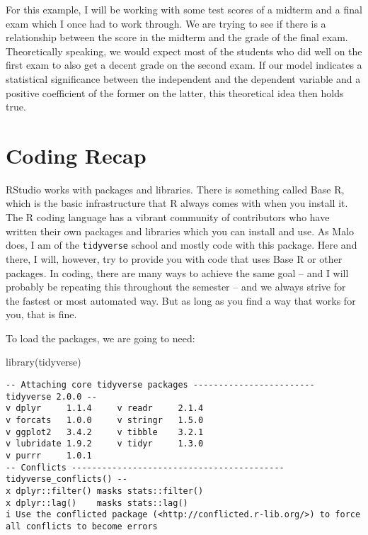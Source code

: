 \documentclass[
  letterpaper,
  DIV=11,
  numbers=noendperiod]{scrreprt}
\newenvironment{Shaded}{\begin{snugshade}}{\end{snugshade}}
\newcommand{\FunctionTok}[1]{\textcolor[rgb]{0.28,0.35,0.67}{#1}}
\newcommand{\NormalTok}[1]{\textcolor[rgb]{0.00,0.23,0.31}{#1}}
\begin{document}
For this example, I will be working with some test scores of a midterm
and a final exam which I once had to work through. We are trying to see
if there is a relationship between the score in the midterm and the
grade of the final exam. Theoretically speaking, we would expect most of
the students who did well on the first exam to also get a decent grade
on the second exam. If our model indicates a statistical significance
between the independent and the dependent variable and a positive
coefficient of the former on the latter, this theoretical idea then
holds true.

\hypertarget{coding-recap}{%
\section{Coding Recap}\label{coding-recap}}

RStudio works with packages and libraries. There is something called
Base R, which is the basic infrastructure that R always comes with when
you install it. The R coding language has a vibrant community of
contributors who have written their own packages and libraries which you
can install and use. As Malo does, I am of the \texttt{tidyverse} school
and mostly code with this package. Here and there, I will, however, try
to provide you with code that uses Base R or other packages. In coding,
there are many ways to achieve the same goal -- and I will probably be
repeating this throughout the semester -- and we always strive for the
fastest or most automated way. But as long as you find a way that works
for you, that is fine.

To load the packages, we are going to need:

\begin{Shaded}
\begin{Highlighting}[]
\FunctionTok{library}\NormalTok{(tidyverse)}
\end{Highlighting}
\end{Shaded}

\begin{verbatim}
-- Attaching core tidyverse packages ------------------------ tidyverse 2.0.0 --
v dplyr     1.1.4     v readr     2.1.4
v forcats   1.0.0     v stringr   1.5.0
v ggplot2   3.4.2     v tibble    3.2.1
v lubridate 1.9.2     v tidyr     1.3.0
v purrr     1.0.1     
-- Conflicts ------------------------------------------ tidyverse_conflicts() --
x dplyr::filter() masks stats::filter()
x dplyr::lag()    masks stats::lag()
i Use the conflicted package (<http://conflicted.r-lib.org/>) to force all conflicts to become errors
\end{verbatim}
\end{document}

